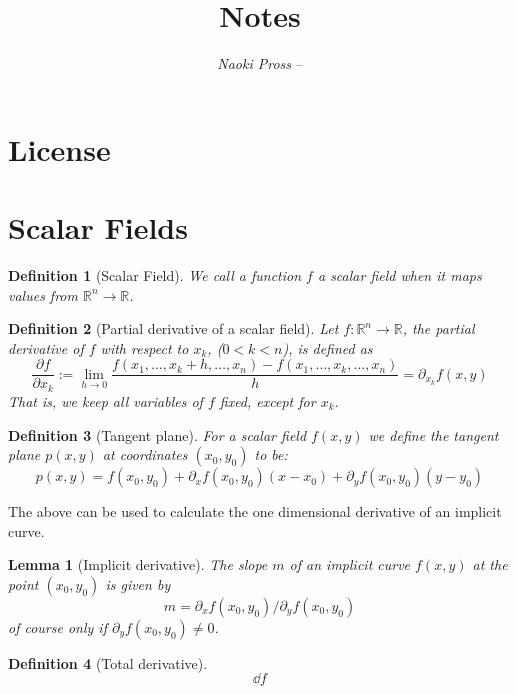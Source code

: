 \documentclass[twocolumn]{tex/hsrzf}
\author{\textsl{Naoki Pross} -- \texttt{\theauthoremail}}
\title{\texttt{\themodule} Notes}
\date{\thesemester}
\newcommand\Rset{\mathbb{R}}
\theoremstyle{fuvarzf}
\newtheorem{definition}{Definition}
\newtheorem{lemma}{Lemma}
\begin{document}
\maketitle
\tableofcontents

\section*{License}
\doclicenseThis

\section{Scalar Fields}

\begin{definition}[Scalar Field]
  We call a function \(f\) a \emph{scalar field} when it maps values from
  \(\Rset^n \to \Rset\).
\end{definition}

\begin{definition}[Partial derivative of a scalar field]
  Let \(f: \Rset^n \to \Rset\), the \emph{partial} derivative of \(f\) with
  respect to \(x_k\), (\(0 < k < n\)), is defined as
  \[
    \frac{\partial f}{\partial x_k} :=
    \lim_{h \to 0} \frac{f(x_1, \dots, x_k + h, \dots, x_n) 
      - f(x_1, \dots, x_k, \dots, x_n)}{h}
    = \partial_{x_k} f(x, y)
  \]
  That is, we keep all variables of \(f\) fixed, except for \(x_k\).
\end{definition}

\begin{definition}[Tangent plane]
  For a scalar field \(f(x,y)\) we define the \emph{tangent plane} \(p(x,y)\)
  at coordinates \((x_0, y_0)\) to be:
  \[
    p(x, y) =
      f(x_0, y_0)
      + \partial_x f(x_0, y_0) (x - x_0)
      + \partial_y f(x_0, y_0) (y - y_0)
  \]
\end{definition}

The above can be used to calculate the one dimensional derivative of an implicit curve.

\begin{lemma}[Implicit derivative]
  The slope \(m\) of an implicit curve \(f(x,y)\) at the point \((x_0, y_0)\) is given by
  \[
    m = \partial_x f(x_0, y_0) / \partial_y f(x_0, y_0)
  \]
  of course only if \(\partial_y f(x_0, y_0) \neq 0\).
\end{lemma}

\begin{definition}[Total derivative]
  \[
    \dd{f}
  \]
\end{definition}
\end{document}
